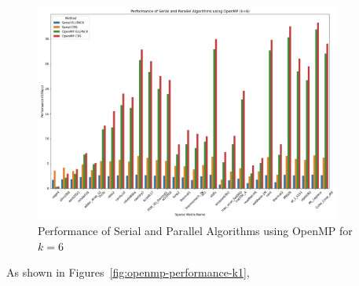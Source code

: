 \documentclass[12pt,oneside]{book} %
\begin{document}
\begin{figure}[H]
    \centering
    \includegraphics[width=0.9\textwidth]{../results/images/openMP_Performance_k6.png}
    \caption{Performance of Serial and Parallel Algorithms using OpenMP for $k=6$}
    \label{fig:openmp-performance-k6}
\end{figure}

As shown in Figures~\ref{fig:openmp-performance-k1},
\end{document}
